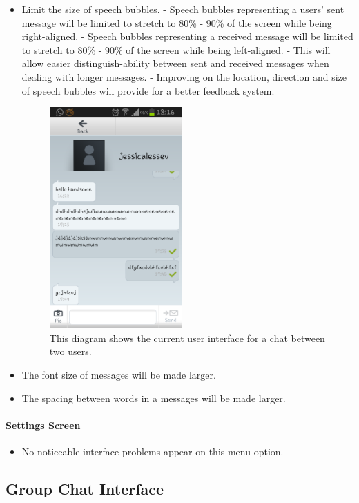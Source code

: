 \documentclass[11pt]{article}
\begin{document}
\begin{itemize}
\item	Limit the size of speech bubbles.
\subitem - Speech bubbles representing a users' sent message will be limited to stretch to 80\% - 90\% of the screen while being right-aligned.
\subitem	- Speech bubbles representing a received message will be limited to stretch to 80\% - 90\% of the screen while being left-aligned. 
\subitem	- This will allow easier distinguish-ability between sent and received messages when dealing with longer messages.
\subitem	- Improving on the location, direction and size of speech bubbles will provide for a better feedback system.
\begin{figure}[H]
\centering
\includegraphics[width=2in]{./images/screen.png}
\caption[Sample Chat Screen]{This diagram shows the current user interface for a chat between two users.}
\label{cd-chat-interface-2}
\end{figure}

\item	The font size of messages will be made larger.

\item	The spacing between words in a messages will be made larger.
\end{itemize}

\paragraph{Settings Screen}
\begin{itemize}
\item No noticeable interface problems appear on this menu option.
\end{itemize}

\subsection{Group Chat Interface}
\end{document}

